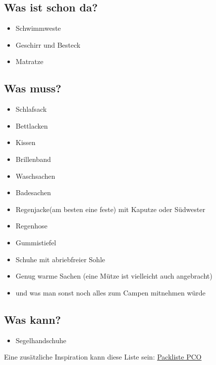 \documentclass[12pt]{article}
\begin{document}
\subsection*{Was ist schon da?}
\begin{itemize}
\renewcommand{\labelitemi}{$\boxempty$}
\item Schwimmweste
\item Geschirr und Besteck
\item Matratze
\end{itemize}

\subsection*{Was muss?}
\begin{itemize}
\renewcommand{\labelitemi}{$\boxempty$}
\item Schlafsack
\item Bettlacken
\item Kissen
\item Brillenband
\item Waschsachen
\item Badesachen
\item Regenjacke(am besten eine feste) mit Kaputze oder Südwester
\item Regenhose
\item Gummistiefel
\item Schuhe mit abriebfreier Sohle
\item Genug warme Sachen (eine Mütze ist vielleicht auch angebracht)
\item und was man sonst noch alles zum Campen mitnehmen würde
\end{itemize}

\subsection*{Was kann?}
\begin{itemize}
\renewcommand{\labelitemi}{$\boxempty$}
\item Segelhandschuhe

\end{itemize}

Eine zusätzliche Inspiration kann diese Liste sein: \href{http://www.pc-ostsee.de/yachtcharter/sites/download/Packliste.pdf}{Packliste PCO}

\end{document}
